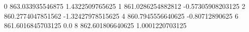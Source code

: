 0 863.033935546875 1.4322509765625
1 861.0286254882812 -0.57305908203125
2 860.2774047851562 -1.32427978515625
4 860.7945556640625 -0.80712890625
6 861.6016845703125 0.0
8 862.601806640625 1.0001220703125
